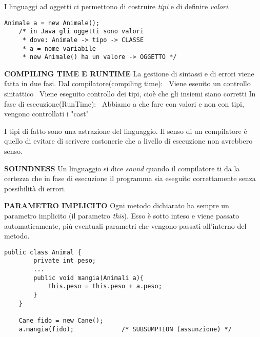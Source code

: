 \noindent I linguaggi ad oggetti ci permettono di costruire \textit{tipi} e di definire \textit{valori}. 
\begin{lstlisting}[basicstyle=\small,]
	Animale a = new Animale();
	/* in Java gli oggetti sono valori
	 * dove: Animale -> tipo -> CLASSE
	 * a = nome variabile
	 * new Animale() ha un valore -> OGGETTO */
\end{lstlisting}

\noindent \textbf{COMPILING TIME E RUNTIME} \newline
La gestione di sintassi e di errori viene fatta in due fasi.
Dal compilatore(compiling time): \newline
\textbullet\ Viene eseuito un controllo sintattico \newline
\textbullet\ Viene eseguito controllo dei tipi, cioè che gli insiemi siano corretti\newline
In fase di esecuzione(RunTime):\newline
\textbullet\ Abbiamo a che fare con valori e non con tipi, vengono controllati i "cast"

\noindent I tipi di fatto sono una astrazione del linguaggio. \newline
Il senso di un compilatore è quello di evitare di scrivere castonerie che a livello di esecuzione non avrebbero senso.

\noindent \textbf{SOUNDNESS} \newline
Un linguaggio si dice \textit{sound} quando il compilatore ti da la certezza che in fase di esecuzione il programma sia eseguito correttamente senza possibilità di errori.

\noindent \textbf{PARAMETRO IMPLICITO} \newline
 Ogni metodo dichiarato ha sempre un parametro implicito (il parametro \textit{this}). Esso è sotto inteso e viene passato automaticamente, più eventuali parametri che vengono passati all'interno del metodo.
\begin{lstlisting}[basicstyle=\small,]
	public class Animal {
		private int peso;
		...
		public void mangia(Animali a){
			this.peso = this.peso + a.peso;
		}
	}
	
	Cane fido = new Cane();
	a.mangia(fido); 			/* SUBSUMPTION (assunzione)	*/
\end{lstlisting}

